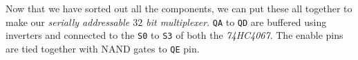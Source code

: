\documentclass[../../main]{subfiles}
\begin{document}
Now that we have sorted out all the components, we can put these all together to make
our \emph{serially addressable $32$ bit multiplexer}. \texttt{QA} to \texttt{QD} are buffered using inverters and connected to the \texttt{S0} to \texttt{S3} of both the \emph{74HC4067}. The enable pins are tied together with NAND gates to \texttt{QE} pin.

%


\pagebreak
\end{document}
